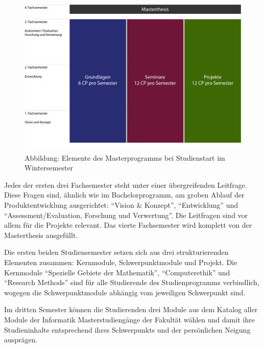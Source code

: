 \begin{figure}[htbp][htbp]
\centering
\includegraphics[width=\columnwidth]{../anhaenge/bilder/ma-saeulen.pdf}
\caption{Abbildung: Elemente des Masterprogramms bei Studienstart im
Wintersemester}
\end{figure}

Jedes der ersten drei Fachsemester steht unter einer übergreifenden
Leitfrage. Diese Fragen sind, ähnlich wie im Bachelorprogramm, am groben
Ablauf der Produktentwicklung ausgerichtet: ``Vision \& Konzept'',
``Entwicklung'' und ``Assessment/Evaluation, Forschung und Verwertung''.
Die Leitfragen sind vor allem für die Projekte relevant. Das vierte
Fachsemester wird komplett von der Masterthesis ausgefüllt.

Die ersten beiden Studiensemester setzen sich aus drei strukturierenden
Elementen zusammen: Kernmodule, Schwerpunktmodule und Projekt. Die
Kernmodule ``Spezielle Gebiete der Mathematik'', ``Computerethik'' und
``Research Methods'' sind für alle Studierende des Studienprogramms
verbindlich, wogegen die Schwerpunktmodule abhängig vom jeweiligen
Schwerpunkt sind.

Im dritten Semester können die Studierenden drei Module aus dem Katalog
aller Module der Informatik Masterstudiengänge der Fakultät wählen und
damit ihre Studieninhalte entsprechend ihres Schwerpunkts und der
persönlichen Neigung ausprägen.


